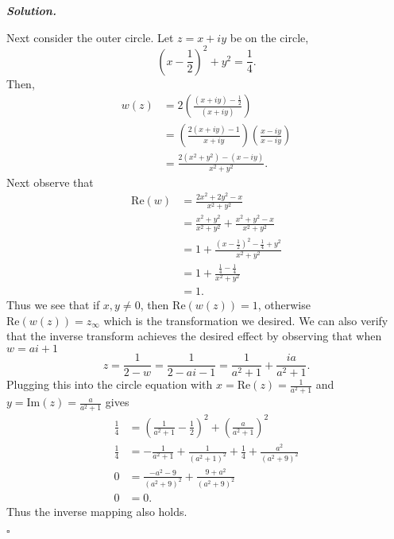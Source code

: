 \documentclass[12pt]{report}
\newenvironment{solution}[1][\it{Solution}]{\textbf{#1. } }{$\square$}
\newcommand{\paren}[1]{{\left(#1\right)}} %
\begin{document}
\begin{solution}
\begin{enumerate}
        \noindent
        Next consider the outer circle. Let $z = x + iy$ be on the circle,
        \[ (x - \frac{1}{2})^2 + y^2 = \frac{1}{4}.\]
        Then,
        \begin{align*}
            w(z) &= 2 \paren{ \frac{(x + iy) - \frac{1}{2}}{(x + iy)}}\\
            &= \paren{ \frac{2(x + iy) - 1}{x + iy} } \paren{ \frac{x - iy}{x - iy}}\\
            &= \frac{2(x^2 + y^2) - (x - iy)}{x^2 + y^2}.
        \end{align*} 
        Next observe that
        \begin{align*}
            \mathrm{Re}(w) &= \frac{2x^2 + 2y^2 - x}{x^2 + y^2}\\
            &= \frac{x^2 + y^2}{x^2 + y^2} + \frac{x^2 + y^2 - x}{x^2 + y^2}\\
            &= 1 + \frac{(x - \frac{1}{2})^2 - \frac{1}{4} + y^2}{x^2 + y^2}\\
            &= 1 + \frac{\frac{1}{4} - \frac{1}{4}}{x^2 + y^2}\\
            &= 1.
        \end{align*}
        Thus we see that if $x,y \neq 0$, then $\mathrm{Re}(w(z)) = 1$, otherwise $\mathrm{Re}(w(z)) = z_\infty$ which is the transformation we desired. We can also verify that the inverse transform achieves the desired effect by observing that when $w = ai + 1$
        \[
            z = \frac{1}{2-w} = \frac{1}{2-ai - 1} = \frac{1}{a^2 + 1} + \frac{i a}{a^2 + 1}.
        \]
        Plugging this into the circle equation with $x = \mathrm{Re}(z) = \frac{1}{a^2 + 1}$ and $y = \mathrm{Im}(z) = \frac{a}{a^2 + 1}$ gives
        \begin{align*}
            \frac{1}{4} &= (\frac{1}{a^2 + 1} - \frac{1}{2})^2 + (\frac{a}{a^2 + 1})^2\\
            \frac{1}{4} &= -\frac{1}{a^2 + 1} + \frac{1}{(a^2 + 1)^2} + \frac{1}{4} + \frac{a^2}{(a^2 + 9)^2}\\
            0 &= \frac{-a^2 - 9}{(a^2 + 9)^2} + \frac{9 + a^2}{(a^2 + 9)^2}\\
            0 &= 0.
        \end{align*} 
        Thus the inverse mapping also holds. 
    \end{enumerate}
\end{solution}

\newpage
\end{document}
